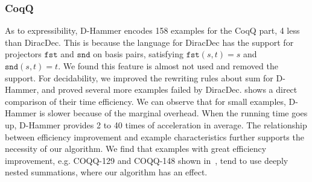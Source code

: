 \subsubsection{CoqQ}
As to expressibility, D-Hammer encodes 158 examples for the CoqQ part, 4 less than DiracDec. This is because the language for DiracDec has the support for projectors $\texttt{fst}$ and $\texttt{snd}$ on basis pairs, satisfying $\texttt{fst} (s, t) = s$ and $\texttt{snd} (s, t) = t$. We found this feature is almost not used and removed the support. For decidability, we improved the rewriting rules about sum for D-Hammer, and proved several more examples failed by DiracDec. 
 shows a direct comparison of their time efficiency.
We can observe that for small examples, D-Hammer is slower because of the marginal overhead. 
When the running time goes up, D-Hammer provides 2 to 40 times of acceleration in average.
The relationship between efficiency improvement and example characteristics further supports the necessity of our algorithm. 
We find that examples with great efficiency improvement, e.g. COQQ-129 and COQQ-148 shown in~, tend to use deeply nested summations, where our algorithm has an effect.



